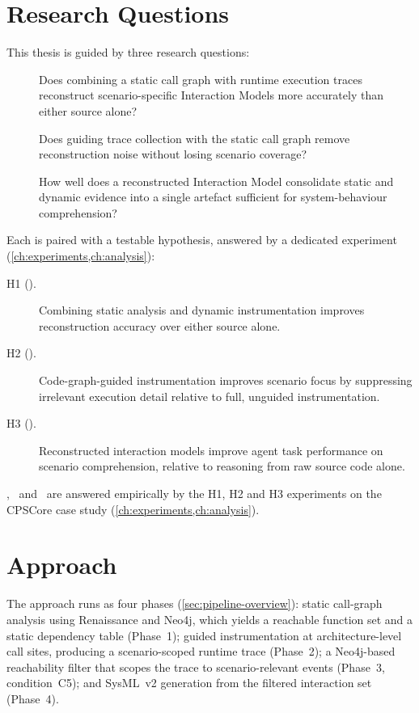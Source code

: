 \section{Research Questions}

This thesis is guided by three research questions:

\begin{description}
  \item[\rqone] Does combining a static call graph with runtime execution
    traces reconstruct scenario-specific Interaction Models more
    accurately than either source alone?

  \item[\rqtwo] Does guiding trace collection with the static call graph
    remove reconstruction noise without losing scenario coverage?

  \item[\rqthree] How well does a reconstructed \sysml Interaction Model
    consolidate static and dynamic evidence into a single artefact
    sufficient for system-behaviour comprehension?
\end{description}

Each is paired with a testable hypothesis, answered by a dedicated
experiment (\cref{ch:experiments,ch:analysis}):

\begin{description}
  \item[H1 (\rqone).] Combining static analysis and dynamic instrumentation
    improves reconstruction accuracy over either source alone.
  \item[H2 (\rqtwo).] Code-graph-guided instrumentation improves scenario
    focus by suppressing irrelevant execution detail relative to full,
    unguided instrumentation.
  \item[H3 (\rqthree).] Reconstructed interaction models improve agent task
    performance on scenario comprehension, relative to reasoning from raw
    source code alone.
\end{description}

\rqone, \rqtwo\ and \rqthree\ are answered empirically by the H1, H2 and
H3 experiments on the CPSCore case study (\cref{ch:experiments,ch:analysis}).

\section{Approach}

The approach runs as four phases (\cref{sec:pipeline-overview}):
static call-graph analysis using Renaissance and Neo4j, which yields
a reachable function set and a static dependency table
(Phase~1); guided instrumentation at architecture-level call sites,
producing a scenario-scoped runtime trace (Phase~2); a Neo4j-based
reachability filter that scopes the trace to scenario-relevant events
(Phase~3, condition~C5); and SysML~v2 generation from the filtered
interaction set (Phase~4).


